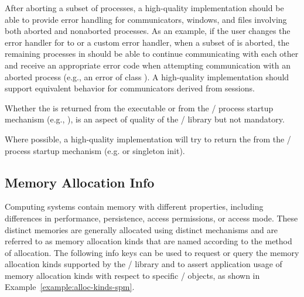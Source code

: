 \begin{implementors}
    After aborting a subset of processes, a high-quality implementation should
    be able to provide error handling for communicators, windows, and files
    involving both aborted and nonaborted processes. As an example, if the
    user changes the error handler for  to
     or a custom error handler, when a subset of
     is aborted, the remaining processes in
     should be able to continue communicating with each
    other and receive an appropriate error code when attempting communication
    with an aborted process (e.g., an error of class ).
    A high-quality implementation should support
    equivalent behavior for communicators derived from sessions.
\end{implementors}

\begin{users}
Whether the  is returned from the executable or from the
\MPI/ process startup mechanism (e.g., ), is an aspect of quality
of the \MPI/ library but not mandatory.
\end{users}
\begin{implementors}
Where possible, a high-quality implementation will try to return the
 from the \MPI/ process startup mechanism
(e.g.  or singleton init).
\end{implementors}

\subsection{Memory Allocation Info}
\label{subsec:mem_alloc_kinds}

Computing systems contain memory with different properties, including differences in
performance, persistence, access permissions, or access mode.
These distinct memories are generally allocated using distinct mechanisms and are
referred to as memory allocation kinds that are named according to the method of allocation.
The following info keys can be used to request or query the memory allocation
kinds supported by the \MPI/ library and to assert application usage of memory
allocation kinds with respect to specific \MPI/ objects, as shown in Example~\ref{example:alloc-kinds-spm}.

